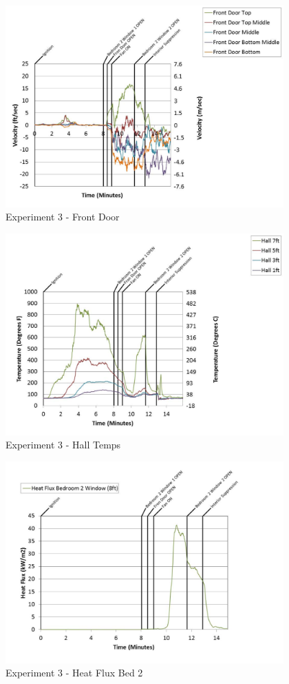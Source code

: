 \documentclass{article}
\begin{document}
\begin{appendices}
	\begin{figure}[h!]
		\centering
		\includegraphics[height=3.05in]{0_Images/Results_Charts/Exp_3_Charts/FrontDoor.pdf}
		\caption{Experiment 3 - Front Door}
	\end{figure}
 
	\clearpage

	\begin{figure}[h!]
		\centering
		\includegraphics[height=3.05in]{0_Images/Results_Charts/Exp_3_Charts/HallTemps.pdf}
		\caption{Experiment 3 - Hall Temps}
	\end{figure}
 

	\begin{figure}[h!]
		\centering
		\includegraphics[height=3.05in]{0_Images/Results_Charts/Exp_3_Charts/HeatFluxBed2.pdf}
		\caption{Experiment 3 - Heat Flux Bed 2}
	\end{figure}
 

\end{appendices}
\end{document}
